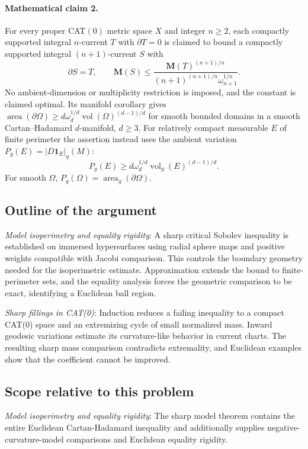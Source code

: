 \documentclass[11pt]{article}
\begin{document}
\paragraph{Mathematical claim 2.} For every proper CAT$(0)$ metric space $X$ and integer $n\ge2$, each compactly supported integral $n$-current $T$ with $\partial T=0$ is claimed to bound a compactly supported integral $(n+1)$-current $S$ with \[\partial S=T,\qquad\mathbf M(S)\le\frac{\mathbf M(T)^{(n+1)/n}}{(n+1)^{(n+1)/n}\omega_{n+1}^{1/n}}.\] No ambient-dimension or multiplicity restriction is imposed, and the constant is claimed optimal. Its manifold corollary gives $\operatorname{area}(\partial\Omega)\ge d\omega_d^{1/d}\operatorname{vol}(\Omega)^{(d-1)/d}$ for smooth bounded domains in a smooth Cartan--Hadamard $d$-manifold, $d\ge3$. For relatively compact measurable $E$ of finite perimeter the assertion instead uses the ambient variation $P_g(E)=|D\mathbf1_E|_g(M)$: \[P_g(E)\ge d\omega_d^{1/d}\operatorname{vol}_g(E)^{(d-1)/d}.\] For smooth $\Omega$, $P_g(\Omega)=\operatorname{area}_g(\partial\Omega)$.

\subsection{Outline of the argument}
\textit{Model isoperimetry and equality rigidity}: A sharp critical Sobolev inequality is established on immersed hypersurfaces using radial sphere maps and positive weights compatible with Jacobi comparison. This controls the boundary geometry needed for the isoperimetric estimate. Approximation extends the bound to finite-perimeter sets, and the equality analysis forces the geometric comparison to be exact, identifying a Euclidean ball region.

\textit{Sharp fillings in CAT(0)}: Induction reduces a failing inequality to a compact CAT(0) space and an extremizing cycle of small normalized mass. Inward geodesic variations estimate its curvature-like behavior in current charts. The resulting sharp mass comparison contradicts extremality, and Euclidean examples show that the coefficient cannot be improved.

\subsection{Scope relative to this problem}
\textit{Model isoperimetry and equality rigidity}: The sharp model theorem contains the entire Euclidean Cartan-Hadamard inequality and additionally supplies negative-curvature-model comparisons and Euclidean equality rigidity.
\end{document}
